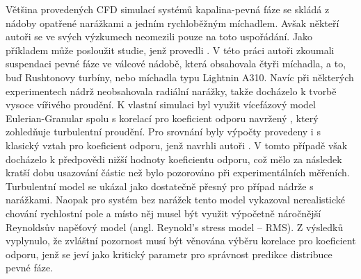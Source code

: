 Většina provedených CFD simulací systémů kapalina-pevná fáze se skládá z nádoby opatřené narážkami a jedním rychloběžným míchadlem. Avšak někteří autoři se ve svých výzkumech neomezili pouze na toto uspořádání. Jako příkladem může posloužit studie, jenž provedli \citet{mon04}. V této práci autoři zkoumali suspendaci pevné fáze ve válcové nádobě, která obsahovala čtyři míchadla, a to, buď Rushtonovy turbíny, nebo míchadla typu Lightnin A310. Navíc při některých experimentech nádrž neobsahovala radiální narážky, takže docházelo k tvorbě vysoce vířivého proudění. K vlastní simulaci byl využit vícefázový model Eulerian-Granular spolu s korelací pro koeficient odporu navržený \citet{pin01}, který zohledňuje turbulentní proudění. Pro srovnání byly výpočty provedeny i s klasický vztah pro koeficient odporu, jenž navrhli autoři \citet{schi32}. V tomto případě však docházelo k předpovědi nižší hodnoty koeficientu odporu, což mělo za následek kratší dobu usazování částic než bylo pozorováno při experimentálních měřeních. Turbulentní model \keps{} se ukázal jako dostatečně přesný pro případ nádrže s narážkami. Naopak pro systém bez narážek tento model vykazoval nerealistické chování rychlostní pole a místo něj musel být využit výpočetně náročnější Reynoldsův napěťový model (angl. Reynold's stress model -- RMS). Z výsledků vyplynulo, že zvláštní pozornost musí být věnována výběru korelace pro koeficient odporu, jenž se jeví jako kritický parametr pro správnost predikce distribuce pevné fáze.   

   
